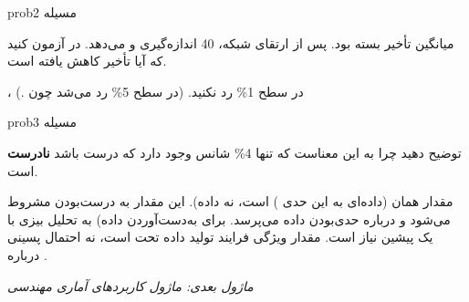 \begin{PSbox}[unbreakable]{prob}{مسیله 2}

میانگین تأخیر بسته  بود. پس از ارتقای شبکه، 40 اندازه‌گیری  و  می‌دهد. در  آزمون کنید که آیا تأخیر کاهش یافته است.

\PSsolution{} ،  در سطح 1\% رد نکنید. (در سطح 5\% رد می‌شد چون .)

\end{PSbox}

\begin{PSbox}[unbreakable]{prob}{مسیله 3}

توضیح دهید چرا  به این معناست که تنها 4\% شانس وجود دارد که  درست باشد \textbf{نادرست} است.

\PSsolution{} مقدار  همان (داده‌ای به این حدی ) است، نه  داده). این مقدار به  درست‌بودن مشروط می‌شود و درباره حدی‌بودن داده می‌پرسد. برای به‌دست‌آوردن  داده) به تحلیل بیزی با یک پیشین نیاز است. مقدار  ویژگی فرایند تولید داده تحت  است، نه احتمال پسینی درباره .

\emph{ماژول بعدی: {ماژول  کاربردهای آماری مهندسی}}\PSbr{}

\end{PSbox}

